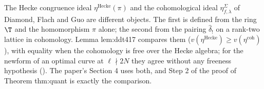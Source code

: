 \begin{warning}\label{warn:congruence:two-ideals}
The Hecke congruence ideal $\eta^{\mathrm{Hecke}}(\pi)$ and the cohomological ideal $\eta^\Sigma_{f,\lambda}$ of Diamond, Flach and Guo are different objects. The first is defined from the
ring $\T$ and the homomorphism $\pi$ alone; the second from the pairing $\hat\delta_!$ on a rank-two lattice in cohomology. Lemma lem:ddt417 compares them
($v(\eta^{\mathrm{Hecke}})\ge v(\eta^{\mathrm{coh}})$), with equality when the cohomology is free over the Hecke algebra; for the newform of an optimal curve at $\ell\nmid2N$ they agree
without any freeness hypothesis (). The paper's Section 4 uses both, and Step 2 of the proof of Theorem thm:quant is exactly the comparison.
\end{warning}

